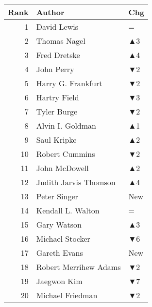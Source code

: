 \documentclass[
  10pt,
  letterpaper,
  DIV=11,
  numbers=noendperiod,
  twoside]{scrartcl}
\begin{document}
\begin{table}
\begin{minipage}{0.20\linewidth}
{\begin{tabular}{rll}
\toprule
Rank & Author & Chg\\
\midrule
1 & David Lewis & =\\
2 & Thomas Nagel & \textcolor[RGB]{34,178,34}{▲3}\\
3 & Fred Dretske & \textcolor[RGB]{34,178,34}{▲4}\\
4 & John Perry & \textcolor[RGB]{178,34,34}{▼2}\\
5 & Harry G. Frankfurt & \textcolor[RGB]{178,34,34}{▼2}\\
6 & Hartry Field & \textcolor[RGB]{178,34,34}{▼3}\\
7 & Tyler Burge & \textcolor[RGB]{178,34,34}{▼2}\\
8 & Alvin I. Goldman & \textcolor[RGB]{34,178,34}{▲1}\\
9 & Saul Kripke & \textcolor[RGB]{34,178,34}{▲2}\\
10 & Robert Cummins & \textcolor[RGB]{178,34,34}{▼2}\\
11 & John McDowell & \textcolor[RGB]{34,178,34}{▲2}\\
12 & Judith Jarvis Thomson & \textcolor[RGB]{34,178,34}{▲4}\\
13 & Peter Singer & \textcolor[RGB]{34,178,34}{New}\\
14 & Kendall L. Walton & =\\
15 & Gary Watson & \textcolor[RGB]{34,178,34}{▲3}\\
16 & Michael Stocker & \textcolor[RGB]{178,34,34}{▼6}\\
17 & Gareth Evans & \textcolor[RGB]{34,178,34}{New}\\
18 & Robert Merrihew Adams & \textcolor[RGB]{178,34,34}{▼2}\\
19 & Jaegwon Kim & \textcolor[RGB]{178,34,34}{▼7}\\
20 & Michael Friedman & \textcolor[RGB]{178,34,34}{▼2}\\
\bottomrule
\end{tabular}

}

\end{minipage}%
%
\begin{minipage}{0.20\linewidth}


\centering{

}
\end{minipage}
\end{table}
\end{document}
